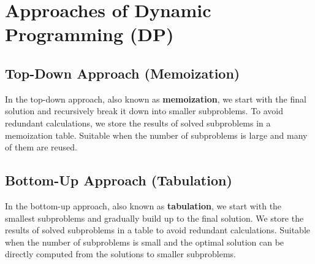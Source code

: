\section{Approaches of Dynamic Programming (DP)}

\subsection{Top-Down Approach (Memoization)}
In the top-down approach, also known as \textbf{memoization}, we start with the final solution and recursively break it down into smaller subproblems. To avoid redundant calculations, we store the results of solved subproblems in a memoization table. Suitable when the number of subproblems is large and many of them are reused.

\subsection{Bottom-Up Approach (Tabulation)}
In the bottom-up approach, also known as \textbf{tabulation}, we start with the smallest subproblems and gradually build up to the final solution. We store the results of solved subproblems in a table to avoid redundant calculations. Suitable when the number of subproblems is small and the optimal solution can be directly computed from the solutions to smaller subproblems.






























































































